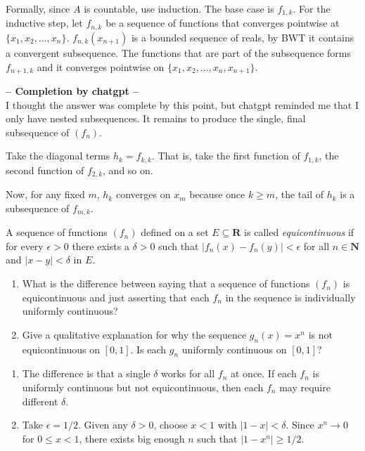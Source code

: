\documentclass{oxmathproblems}
\begin{document}
\begin{questions}
\begin{solution}
\begin{enumerate}[label=(\alph*)]
    Formally, since $A$ is countable, use induction. The base case is $f_{1, k}$. For the inductive step, let $f_{n, k}$ be a sequence of functions that converges pointwise at $\{x_{1}, x_{2}, ..., x_{n}\}$.
    $f_{n, k}(x_{n+1})$ is a bounded sequence of reals, by BWT it contains a convergent subsequence. The functions that are part of the subsequence forms $f_{n+1, k}$ and it converges
    pointwise on $\{x_{1}, x_{2}, ..., x_{n}, x_{n+1}\}$.

    \textbf{-- Completion by chatgpt --}\\
    I thought the answer was complete by this point, but chatgpt reminded me that I only have nested subsequences. It remains to produce the single, final subsequence of $(f_{n})$.

    Take the diagonal terms $h_{k} = f_{k,k}$. That is, take the first function of $f_{1, k}$, the second function of $f_{2, k}$, and so on.

    Now, for any fixed $m$, $h_{k}$ converges on $x_{m}$ because once $k \geq m$, the tail of $h_{k}$ is a subsequence of $f_{m, k}$.
  \end{enumerate}
\end{solution}

\miquestion A sequence of functions $(f_{n})$ defined on a set $E \subseteq \textbf{R}$ is called \textit{equicontinuous} if for every $\epsilon > 0$ there exists a $\delta > 0$
such that $|f_{n}(x)-f_{n}(y)| < \epsilon$ for all $n \in \textbf{N}$ and $|x-y| < \delta$ in $E$.
\begin{enumerate}[label=(\alph*)]
  \item What is the difference between saying that a sequence of functions $(f_{n})$ is equicontinuous and just asserting that each $f_{n}$ in the sequence is individually uniformly continuous?
  \item Give a qualitative explanation for why the sequence $g_{n}(x)=x^{n}$ is not equicontinuous on $[0, 1]$. Is each $g_{n}$ uniformly continuous on $[0, 1]$?
\end{enumerate}

\begin{solution}
  \begin{enumerate}[label=(\alph*)]
    \item The difference is that a single $\delta$ works for all $f_{n}$ at once. If each $f_{n}$ is uniformly continuous but not equicontinuous, then each $f_{n}$ may require different $\delta$.
    \item Take $\epsilon=1/2$. Given any $\delta > 0$, choose $x < 1$ with $|1-x| < \delta$. Since $x^{n} \to 0$ for $0 \leq x < 1$, there exists big enough $n$ such that $|1-x^{n}| \geq 1/2$.


\end{enumerate}
\end{solution}
\end{questions}
\end{document}
